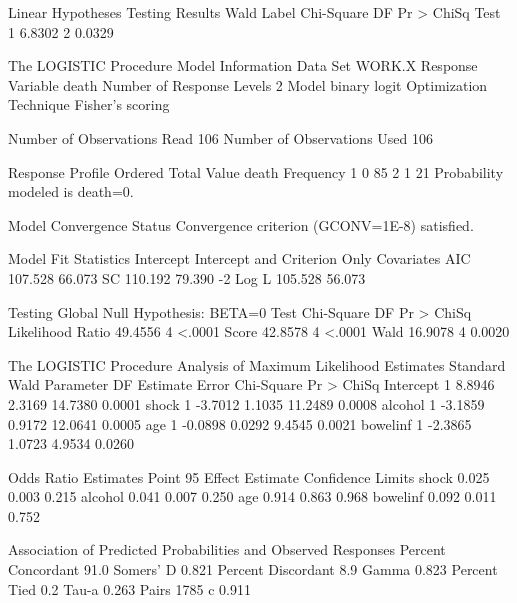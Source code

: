 \documentclass{article}
\begin{document}
\begin{Woutput}
      Linear Hypotheses Testing Results
                   Wald
 Label       Chi-Square      DF    Pr > ChiSq
 Test 1          6.8302       2        0.0329

The LOGISTIC Procedure
              Model Information
Data Set                      WORK.X
Response Variable             death
Number of Response Levels     2
Model                         binary logit
Optimization Technique        Fisher's scoring

Number of Observations Read         106
Number of Observations Used         106

          Response Profile
 Ordered                      Total
   Value        death     Frequency
       1            0            85
       2            1            21
Probability modeled is death=0.

                    Model Convergence Status
         Convergence criterion (GCONV=1E-8) satisfied.

         Model Fit Statistics
                             Intercept
              Intercept            and
Criterion          Only     Covariates
AIC             107.528         66.073
SC              110.192         79.390
-2 Log L        105.528         56.073

        Testing Global Null Hypothesis: BETA=0
Test                 Chi-Square       DF     Pr > ChiSq
Likelihood Ratio        49.4556        4         <.0001
Score                   42.8578        4         <.0001
Wald                    16.9078        4         0.0020

The LOGISTIC Procedure
             Analysis of Maximum Likelihood Estimates
                               Standard          Wald
Parameter    DF    Estimate       Error    Chi-Square    Pr > ChiSq
Intercept     1      8.8946      2.3169       14.7380        0.0001
shock         1     -3.7012      1.1035       11.2489        0.0008
alcohol       1     -3.1859      0.9172       12.0641        0.0005
age           1     -0.0898      0.0292        9.4545        0.0021
bowelinf      1     -2.3865      1.0723        4.9534        0.0260

            Odds Ratio Estimates
               Point          95%
Effect      Estimate      Confidence Limits
shock          0.025       0.003       0.215
alcohol        0.041       0.007       0.250
age            0.914       0.863       0.968
bowelinf       0.092       0.011       0.752

Association of Predicted Probabilities and Observed Responses
Percent Concordant     91.0    Somers' D    0.821
Percent Discordant      8.9    Gamma        0.823
Percent Tied            0.2    Tau-a        0.263
Pairs                  1785    c            0.911


\end{Woutput}
\end{document}
